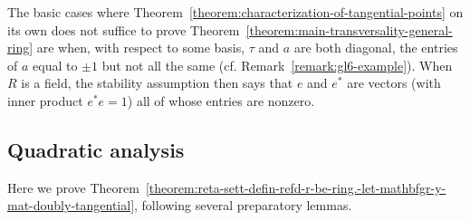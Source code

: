 \documentclass[reqno]{amsart}
\theoremstyle{plain} \newtheorem{theorem} {Theorem} \newtheorem{conjecture} {Conjecture} \newtheorem{corollary} [theorem] {Corollary} \newtheorem{proposition} [theorem] {Proposition} \newtheorem{fact} [theorem] {Fact}
\theoremstyle{definition} \newtheorem{definition} [theorem] {Definition}
\theoremstyle{itplain} %
\begin{document}
\begin{remark}\label{remark:cj4u2pnri2}
The basic cases where Theorem~\ref{theorem:characterization-of-tangential-points} on its own does not suffice to prove Theorem~\ref{theorem:main-transversality-general-ring} are when, with respect to some basis, $\tau$ and $a$ are both diagonal, the entries of $a$ equal to $\pm 1$ but not all the same (cf. Remark~\ref{remark:gl6-example}).  When $R$ is a field, the stability assumption then says that $e$ and $e^*$ are vectors (with inner product $e^* e = 1$) all of whose entries are nonzero.
\end{remark}

\subsection{Quadratic analysis}\label{sec:analysis-second-derivatives}
Here we prove Theorem~\ref{theorem:reta-sett-defin-refd-r-be-ring.-let-mathbfgr-y-mat-doubly-tangential}, following several preparatory lemmas.
\end{document}
